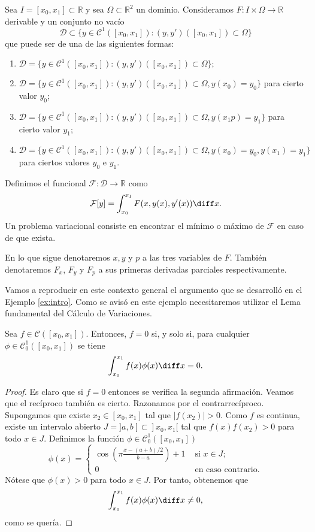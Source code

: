 \documentclass{article}
\begin{document}
\begin{definition} \label{def:pv} Sea $I = [x_0, x_1] \subset \mathbb{R}$ y sea
  $\Omega \subset \mathbb{R}^2$ un dominio. Consideramos $F: I \times \Omega \to \mathbb{R}$
  derivable y un conjunto no vacío
  \[\mathcal{D} \subset \{y \in \mathcal{C}^1([x_0, x_1]): (y, y')([x_0, x_1]) \subset \Omega\}\]
  que puede ser de una de las siguientes formas:
  \begin{enumerate}
  \item $\mathcal{D} = \{y \in \mathcal{C}^1([x_0, x_1]): (y, y')([x_0, x_1]) \subset \Omega\};$
  \item
    $\mathcal{D} = \{y \in \mathcal{C}^1([x_0, x_1]): (y, y')([x_0, x_1]) \subset \Omega, y(x_0) =
    y_0\}$ para cierto valor $y_0$;
  \item
    $\mathcal{D} = \{y \in \mathcal{C}^1([x_0, x_1]): (y, y')([x_0, x_1]) \subset \Omega, y(x_1p) =
    y_1\}$ para cierto valor $y_1$;
  \item
    $\mathcal{D} = \{y \in \mathcal{C}^1([x_0, x_1]): (y, y')([x_0, x_1]) \subset \Omega, y(x_0) =
    y_0, y(x_1) = y_1\}$ para ciertos valores $y_0$ e $y_1$.
  \end{enumerate}

  Definimos el funcional $\mathcal{F}: \mathcal{D} \to \mathbb{R}$ como
  \[\mathcal{F}[y] = \int_{x_0}^{x_1} F(x, y(x), y'(x)) \diff x.\]
  Un problema variacional consiste en encontrar el mínimo o máximo de $\mathcal{F}$ en caso de que
  exista.
\end{definition}

En lo que sigue denotaremos $x,y$ y $p$ a las tres variables de $F$. También denotaremos $F_x$,
$F_y$ y $F_p$ a sus primeras derivadas parciales respectivamente.

Vamos a reproducir en este contexto general el argumento que se desarrolló en el Ejemplo
\ref{ex:intro}. Como se avisó en este ejemplo necesitaremos utilizar el Lema fundamental del Cálculo
de Variaciones.

\begin{thm}
  Sea $f \in \mathcal{C}([x_0, x_1])$. Entonces, $f = 0$ si, y solo si, para cualquier
  $\phi \in \mathcal{C}^1_0([x_0, x_1])$ se tiene
  \[\int_{x_0}^{x_1} f(x) \phi(x) \diff x = 0.\]
\end{thm}
\begin{proof}
  Es claro que si $f = 0$ entonces se verifica la segunda afirmación. Veamos que el recíproco
  también es cierto. Razonamos por el contrarrecíproco. Supongamos que existe $x_2 \in [x_0, x_1]$
  tal que $|f(x_2)| > 0$. Como $f$ es continua, existe un intervalo abierto
  $J = ]a,b[ \subset ]x_0, x_1[$ tal que $f(x)f(x_2) > 0$ para todo $x \in J$. Definimos la función
  $\phi \in \mathcal{C}^1_0([x_0, x_1])$
  \[ \phi(x) = \begin{cases} \cos\left(\pi\frac{x-(a+b)/2}{b-a}\right) + 1 & \text{ si } x \in J; \\
      0 & \text{ en caso contrario}.\end{cases}\] Nótese que $\phi(x) > 0$ para todo $x \in J$. Por
  tanto, obtenemos que
  \[\int_{x_0}^{x_1} f(x) \phi(x) \diff x \ne 0,\]
  como se quería.
\end{proof}
\end{document}
